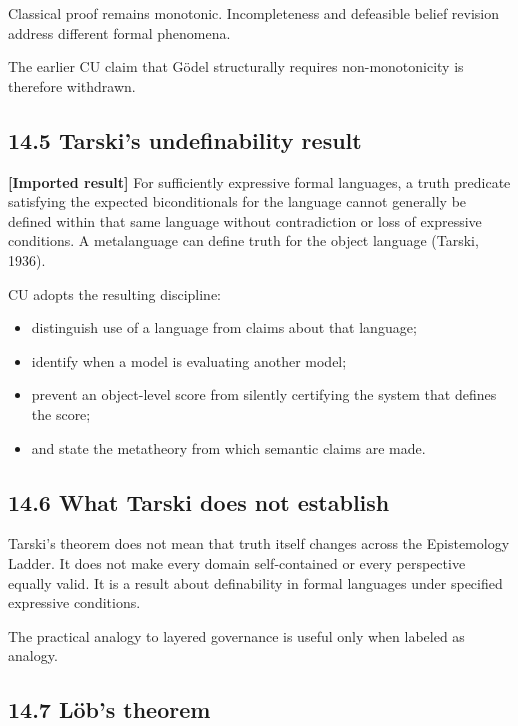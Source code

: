 \documentclass[
  11pt,
]{article}
\providecommand{\tightlist}{%
  \setlength{\itemsep}{0pt}\setlength{\parskip}{0pt}}
\begin{document}
Classical proof remains monotonic. Incompleteness and defeasible belief
revision address different formal phenomena.

The earlier CU claim that Gödel structurally requires non-monotonicity
is therefore withdrawn.

\subsection{14.5 Tarski's undefinability
result}\label{tarskis-undefinability-result}

\textbf{{[}Imported result{]}} For sufficiently expressive formal
languages, a truth predicate satisfying the expected biconditionals for
the language cannot generally be defined within that same language
without contradiction or loss of expressive conditions. A metalanguage
can define truth for the object language (Tarski, 1936).

CU adopts the resulting discipline:

\begin{itemize}
\tightlist
\item
  distinguish use of a language from claims about that language;
\item
  identify when a model is evaluating another model;
\item
  prevent an object-level score from silently certifying the system that
  defines the score;
\item
  and state the metatheory from which semantic claims are made.
\end{itemize}

\subsection{14.6 What Tarski does not
establish}\label{what-tarski-does-not-establish}

Tarski's theorem does not mean that truth itself changes across the
Epistemology Ladder. It does not make every domain self-contained or
every perspective equally valid. It is a result about definability in
formal languages under specified expressive conditions.

The practical analogy to layered governance is useful only when labeled
as analogy.

\subsection{14.7 Löb's theorem}\label{luxf6bs-theorem}
\end{document}
